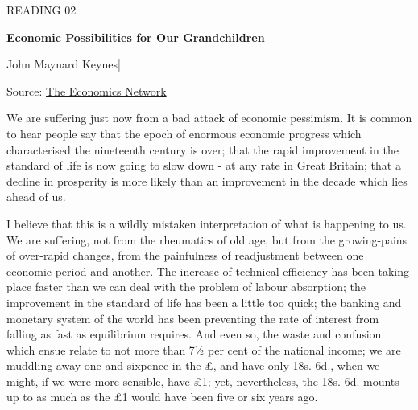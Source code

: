 \begingroup

\thispagestyle{fancy}
\label{article-02}
\begingroup\raggedright
\setlength{\parindent}{0pt}
{\fontsize{9}{12}\selectfont\color{headgrey}READING 02\par}
\vspace{4pt}
{\fontsize{24}{30}\selectfont\bfseries Economic Possibilities for Our Grandchildren\par}
\vspace{7pt}
{\fontsize{12}{18}\selectfont John Maynard Keynes\quad|\par}
\vspace{4pt}
{\fontsize{9}{12.5}\selectfont\color{headgrey}Source: \href{https://www.economicsnetwork.ac.uk/archive/keynes\_persuasion/Economic\_Possibilities\_for\_our\_Grandchildren.htm}{The Economics Network}\par}
\endgroup
\vspace{6pt}


We are suffering just now from a bad attack of economic pessimism. It is common to hear people say that the epoch of enormous economic progress which characterised the nineteenth century is over; that the rapid improvement in the standard of life is now going to slow down - at any rate in Great Britain; that a decline in prosperity is more likely than an improvement in the decade which lies ahead of us.\par

I believe that this is a wildly mistaken interpretation of what is happening to us. We are suffering, not from the rheumatics of old age, but from the growing-pains of over-rapid changes, from the painfulness of readjustment between one economic period and another. The increase of technical efficiency has been taking place faster than we can deal with the problem of labour absorption; the improvement in the standard of life has been a little too quick; the banking and monetary system of the world has been preventing the rate of interest from falling as fast as equilibrium requires. And even so, the waste and confusion which ensue relate to not more than 7½ per cent of the national income; we are muddling away one and sixpence in the £, and have only 18s. 6d., when we might, if we were more sensible, have £1; yet, nevertheless, the 18s. 6d. mounts up to as much as the £1 would have been five or six years ago.\par

